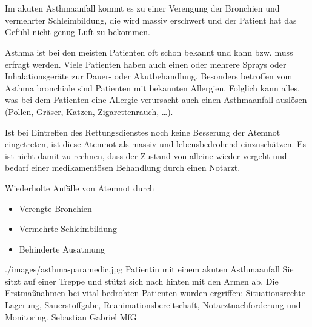 \clearpage %
 

\nocite{Wuttig2009}

\clearpage %
\section{}
\label{topic:asthma-bronchiale}


\TextSlideTeaser
{\TxBeschreibung{}}%
{%
Im akuten Asthmaanfall kommt es zu einer Verengung der
Bronchien und vermehrter Schleimbildung, die 
wird massiv erschwert und der Patient hat das Gefühl nicht
genug Luft zu bekommen.

Asthma ist bei den meisten Patienten oft schon bekannt und
kann bzw. muss erfragt werden. Viele Patienten haben auch
einen oder mehrere Sprays oder Inhalationsgeräte zur Dauer-
oder Akutbehandlung. 
Besonders betroffen vom Asthma bronchiale sind Patienten
mit bekannten Allergien. Folglich kann alles, was bei dem
Patienten eine Allergie verursacht auch einen Asthmaanfall
auslösen (Pollen, Gräser, Katzen, Zigarettenrauch, \ldots). 

Ist bei Eintreffen des Rettungsdienstes noch keine
Besserung der Atemnot eingetreten, ist diese Atemnot als
massiv und lebensbedrohend einzuschätzen. Es ist nicht
damit zu rechnen, dass der Zustand von alleine wieder
vergeht und bedarf einer medikamentösen Behandlung durch einen
Notarzt.}%
{%
Wiederholte Anfälle von Atemnot durch
\begin{itemize}
  \item Verengte Bronchien
  \item Vermehrte Schleimbildung
  \item Behinderte Ausatmung
\end{itemize}}%
{./images/asthma-paramedic.jpg}%
{Patientin mit einem akuten Asthmaanfall}%
{Sie sitzt auf einer Treppe und stützt sich nach hinten mit
den Armen ab. Die Erstmaßnahmen bei vital bedrohten
Patienten wurden ergriffen: Situationsrechte Lagerung,
Sauerstoffgabe, Reanimationsbereitschaft, Notarztnachforderung und Monitoring.\label{fig:asthma-paramedic}}%
{Sebastian Gabriel}%
{MfG}%

